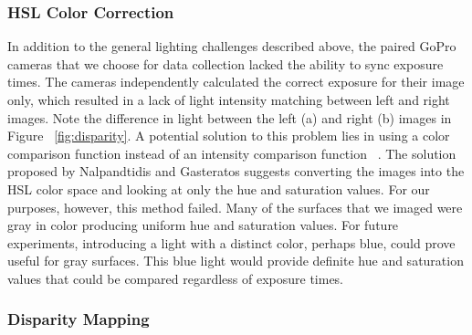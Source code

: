 \documentclass[a4paper,twoside]{article}
\begin{document}
\subsubsection{HSL Color Correction}
\label{subsec:hsl_color_correction}
In addition to the general lighting challenges described above,  the paired GoPro cameras that we choose for data collection lacked the ability to sync exposure times.  
The cameras independently calculated the correct exposure for their image only, which resulted in a lack of light intensity matching between left and right images.
Note the difference in light between the left (a) and right (b) images in Figure ~\ref{fig:disparity}.
A potential solution to this problem lies in using a color comparison function instead of an intensity comparison function ~\cite{stereo:nalGast}.
The solution proposed by Nalpandtidis and Gasteratos suggests converting the images into the HSL color space and looking at only the hue and saturation values.  
 For our purposes, however, this method failed.  
Many of the surfaces that we imaged were gray in color producing uniform hue and saturation values.
For future experiments, introducing a light with a distinct color, perhaps blue, could prove useful for gray surfaces.  
This blue light would provide definite hue and saturation values that could be compared regardless of exposure times.

\subsubsection{Disparity Mapping}
\label{subsec:disparity_mapping}
\end{document}
